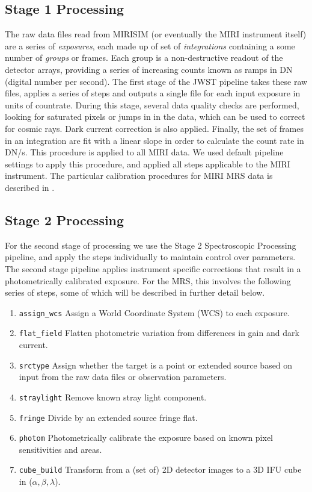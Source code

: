 \subsection{Stage 1 Processing}
The raw data files read from MIRISIM (or eventually the MIRI instrument itself) are a series of \textit{exposures}, each made up of set of \textit{integrations} containing a some number of \textit{groups} or frames.
Each group is a non-destructive readout of the detector arrays, providing a series of increasing counts known as ramps in DN (digital number per second). 
The first stage of the JWST pipeline takes these raw files, applies a series of steps and outputs a single file for each input exposure in units of countrate.
During this stage, several data quality checks are performed, looking for saturated pixels or jumps in in the data, which can be used to correct for cosmic rays.
Dark current correction is also applied.
Finally, the set of frames in an integration are fit with a linear slope in order to calculate the count rate in DN/s.
This procedure is applied to all MIRI data.
We used default pipeline settings to apply this procedure, and applied all steps applicable to the MIRI instrument.
The particular calibration procedures for MIRI MRS data is described in \parencite{ref:mirical}.
\subsection{Stage 2 Processing}
For the second stage of processing we use the Stage 2 Spectroscopic Processing pipeline, and apply the steps individually to maintain control over parameters.
The second stage pipeline applies instrument specific corrections that result in a photometrically calibrated exposure. For the MRS, this involves the following series of steps, some of which will be described in further detail below.
\begin{enumerate}
	\item \verb|assign_wcs| Assign a World Coordinate System (WCS) to each exposure.
	\item \verb|flat_field| Flatten photometric variation from differences in gain and dark current.
	\item \verb|srctype| Assign whether the target is a point or extended source based on input from the raw data files or observation parameters.
	\item \verb|straylight| Remove known stray light component.
	\item \verb|fringe| Divide by an extended source fringe flat.
	\item \verb|photom| Photometrically calibrate the exposure based on known pixel sensitivities and areas.
	\item \verb|cube_build| Transform from a (set of) 2D detector images to a 3D IFU cube in ($\alpha,\beta,\lambda$).
\end{enumerate} 
